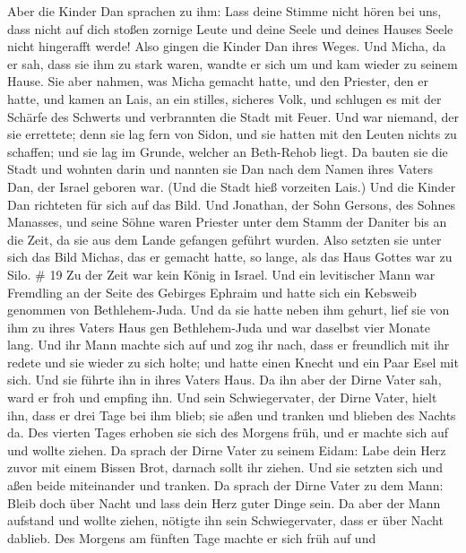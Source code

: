Aber die Kinder Dan sprachen zu ihm: Lass deine Stimme nicht hören bei
uns, dass nicht auf dich stoßen zornige Leute und deine Seele und deines
Hauses Seele nicht hingerafft werde!  Also gingen die
Kinder Dan ihres Weges. Und Micha, da er sah, dass sie ihm zu stark
waren, wandte er sich um und kam wieder zu seinem Hause. 
Sie aber nahmen, was Micha gemacht hatte, und den Priester, den er
hatte, und kamen an Lais, an ein stilles, sicheres Volk, und schlugen es
mit der Schärfe des Schwerts und verbrannten die Stadt mit Feuer.
 Und war niemand, der sie errettete; denn sie lag fern von
Sidon, und sie hatten mit den Leuten nichts zu schaffen; und sie lag im
Grunde, welcher an Beth-Rehob liegt. Da bauten sie die Stadt und wohnten
darin  und nannten sie Dan nach dem Namen ihres Vaters Dan,
der Israel geboren war. (Und die Stadt hieß vorzeiten Lais.)
 Und die Kinder Dan richteten für sich auf das Bild. Und
Jonathan, der Sohn Gersons, des Sohnes Manasses, und seine Söhne waren
Priester unter dem Stamm der Daniter bis an die Zeit, da sie aus dem
Lande gefangen geführt wurden.  Also setzten sie unter sich
das Bild Michas, das er gemacht hatte, so lange, als das Haus Gottes war
zu Silo. \# 19  Zu der Zeit war kein König in Israel. Und
ein levitischer Mann war Fremdling an der Seite des Gebirges Ephraim und
hatte sich ein Kebsweib genommen von Bethlehem-Juda.  Und da
sie hatte neben ihm gehurt, lief sie von ihm zu ihres Vaters Haus gen
Bethlehem-Juda und war daselbst vier Monate lang.  Und ihr
Mann machte sich auf und zog ihr nach, dass er freundlich mit ihr redete
und sie wieder zu sich holte; und hatte einen Knecht und ein Paar Esel
mit sich. Und sie führte ihn in ihres Vaters Haus. Da ihn aber der Dirne
Vater sah, ward er froh und empfing ihn.  Und sein
Schwiegervater, der Dirne Vater, hielt ihn, dass er drei Tage bei ihm
blieb; sie aßen und tranken und blieben des Nachts da.  Des
vierten Tages erhoben sie sich des Morgens früh, und er machte sich auf
und wollte ziehen. Da sprach der Dirne Vater zu seinem Eidam: Labe dein
Herz zuvor mit einem Bissen Brot, darnach sollt ihr ziehen. 
Und sie setzten sich und aßen beide miteinander und tranken. Da sprach
der Dirne Vater zu dem Mann: Bleib doch über Nacht und lass dein Herz
guter Dinge sein.  Da aber der Mann aufstand und wollte
ziehen, nötigte ihn sein Schwiegervater, dass er über Nacht dablieb.
 Des Morgens am fünften Tage machte er sich früh auf und
